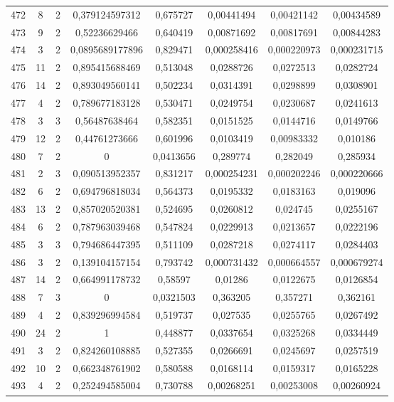 \begin{longtable}{|c|c|c|c|c|c|c|c|}
472 & 8 & 2 & 0,379124597312 & 0,675727 & 0,00441494 & 0,00421142 & 0,00434589  \\
473 & 9 & 2 & 0,52236629466 & 0,640419 & 0,00871692 & 0,00817691 & 0,00844283  \\
474 & 3 & 2 & 0,0895689177896 & 0,829471 & 0,000258416 & 0,000220973 & 0,000231715  \\
475 & 11 & 2 & 0,895415688469 & 0,513048 & 0,0288726 & 0,0272513 & 0,0282724  \\
476 & 14 & 2 & 0,893049560141 & 0,502234 & 0,0314391 & 0,0298899 & 0,0308901  \\
477 & 4 & 2 & 0,789677183128 & 0,530471 & 0,0249754 & 0,0230687 & 0,0241613  \\
478 & 3 & 3 & 0,56487638464 & 0,582351 & 0,0151525 & 0,0144716 & 0,0149766  \\
479 & 12 & 2 & 0,44761273666 & 0,601996 & 0,0103419 & 0,00983332 & 0,010186  \\
480 & 7 & 2 & 0 & 0,0413656 & 0,289774 & 0,282049 & 0,285934  \\
481 & 2 & 3 & 0,090513952357 & 0,831217 & 0,000254231 & 0,000202246 & 0,000220666  \\
482 & 6 & 2 & 0,694796818034 & 0,564373 & 0,0195332 & 0,0183163 & 0,019096  \\
483 & 13 & 2 & 0,857020520381 & 0,524695 & 0,0260812 & 0,024745 & 0,0255167  \\
484 & 6 & 2 & 0,787963039468 & 0,547824 & 0,0229913 & 0,0213657 & 0,0222196  \\
485 & 3 & 3 & 0,794686447395 & 0,511109 & 0,0287218 & 0,0274117 & 0,0284403  \\
486 & 3 & 2 & 0,139104157154 & 0,793742 & 0,000731432 & 0,000664557 & 0,000679274  \\
487 & 14 & 2 & 0,664991178732 & 0,58597 & 0,01286 & 0,0122675 & 0,0126854  \\
488 & 7 & 3 & 0 & 0,0321503 & 0,363205 & 0,357271 & 0,362161  \\
489 & 4 & 2 & 0,839296994584 & 0,519737 & 0,027535 & 0,0255765 & 0,0267492  \\
490 & 24 & 2 & 1 & 0,448877 & 0,0337654 & 0,0325268 & 0,0334449  \\
491 & 3 & 2 & 0,824260108885 & 0,527355 & 0,0266691 & 0,0245697 & 0,0257519  \\
492 & 10 & 2 & 0,662348761902 & 0,580588 & 0,0168114 & 0,0159317 & 0,0165228  \\
493 & 4 & 2 & 0,252494585004 & 0,730788 & 0,00268251 & 0,00253008 & 0,00260924  \\

\end{longtable}
